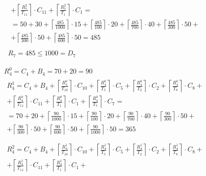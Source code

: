 \begin{gather*}
\begin{multlined}
    + \left\lceil\frac{R_7^2}{T_{11}}\right\rceil\cdot C_{11} + %
    \left\lceil\frac{R_7^2}{T_1}\right\rceil\cdot C_1 = \\%
    = 50 + 30 + \left\lceil\frac{485}{1000}\right\rceil\cdot 15 + %
    \left\lceil\frac{485}{100}\right\rceil\cdot 20 + %
    \left\lceil\frac{485}{700}\right\rceil\cdot 40 + %
    \left\lceil\frac{485}{300}\right\rceil\cdot 50 + \\%
    + \left\lceil\frac{485}{300}\right\rceil\cdot 50 + %
    \left\lceil\frac{485}{600}\right\rceil\cdot 50 = 485 \\
  \end{multlined} \\
  R_7 = 485 \le 1000 = D_7
\end{gather*}

\begin{gather*}
  R_4^0 = C_4 + B_4 = 70 + 20 = 90 \\
  \begin{multlined}
    R_4^1 = C_4 + B_4 + \left\lceil\frac{R_4^0}{T_{10}}\right\rceil\cdot C_{10} + %
    \left\lceil\frac{R_4^0}{T_5}\right\rceil\cdot C_5 + %
    \left\lceil\frac{R_4^0}{T_2}\right\rceil\cdot C_2 + %
    \left\lceil\frac{R_4^0}{T_8}\right\rceil\cdot C_8 + \\%
    + \left\lceil\frac{R_4^0}{T_{11}}\right\rceil\cdot C_{11} + %
    \left\lceil\frac{R_4^0}{T_1}\right\rceil\cdot C_1 +%
    \left\lceil\frac{R_4^0}{T_7}\right\rceil\cdot C_7 = \\%
    = 70 + 20 + \left\lceil\frac{90}{1000}\right\rceil\cdot 15 + %
    \left\lceil\frac{90}{100}\right\rceil\cdot 20 + %
    \left\lceil\frac{90}{700}\right\rceil\cdot 40 + %
    \left\lceil\frac{90}{300}\right\rceil\cdot 50 + \\%
    + \left\lceil\frac{90}{300}\right\rceil\cdot 50 + %
    \left\lceil\frac{90}{600}\right\rceil\cdot 50 + %
    \left\lceil\frac{90}{1000}\right\rceil\cdot 50 = 365 \\
  \end{multlined} \\
  \begin{multlined}
    R_4^2 = C_4 + B_4 + \left\lceil\frac{R_4^1}{T_{10}}\right\rceil\cdot C_{10} + %
    \left\lceil\frac{R_4^1}{T_5}\right\rceil\cdot C_5 + %
    \left\lceil\frac{R_4^1}{T_2}\right\rceil\cdot C_2 + %
    \left\lceil\frac{R_4^1}{T_8}\right\rceil\cdot C_8 + \\%
    + \left\lceil\frac{R_4^1}{T_{11}}\right\rceil\cdot C_{11} + %
    \left\lceil\frac{R_4^1}{T_1}\right\rceil\cdot C_1 +%

\end{multlined}
\end{gather*}

